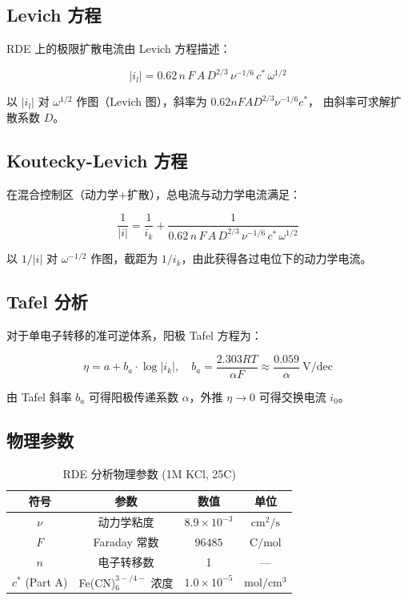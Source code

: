 \documentclass[12pt,a4paper]{ctexart}
\begin{document}
\subsection{Levich 方程}

RDE 上的极限扩散电流由 Levich 方程描述\cite{bard2001}：

\begin{equation}
|i_l| = 0.62\, n\, F\, A\, D^{2/3}\, \nu^{-1/6}\, c^*\, \omega^{1/2}
\label{eq:levich}
\end{equation}

以 $|i_l|$ 对 $\omega^{1/2}$ 作图（Levich 图），斜率为 $0.62 n F A D^{2/3} \nu^{-1/6} c^*$，
由斜率可求解扩散系数 $D$。

\subsection{Koutecky-Levich 方程}

在混合控制区（动力学+扩散），总电流与动力学电流满足：

\begin{equation}
\frac{1}{|i|} = \frac{1}{i_k} + \frac{1}{0.62\, n\, F\, A\, D^{2/3}\, \nu^{-1/6}\, c^*\, \omega^{1/2}}
\label{eq:kl}
\end{equation}

以 $1/|i|$ 对 $\omega^{-1/2}$ 作图，截距为 $1/i_k$，由此获得各过电位下的动力学电流。

\subsection{Tafel 分析}

对于单电子转移的准可逆体系，阳极 Tafel 方程为：

\begin{equation}
\eta = a + b_a \cdot \log|i_k|, \quad b_a = \frac{2.303 RT}{\alpha F} \approx \frac{0.059}{\alpha}\ \text{V/dec}
\label{eq:tafel}
\end{equation}

由 Tafel 斜率 $b_a$ 可得阳极传递系数 $\alpha$，外推 $\eta \rightarrow 0$ 可得交换电流 $i_0$。

\subsection{物理参数}

\begin{table}[h]
\centering
\caption{RDE 分析物理参数 (1M KCl, 25\textdegree C)}
\begin{tabular}{cccc}
\toprule
符号 & 参数 & 数值 & 单位 \\
\midrule
$\nu$ & 动力学粘度 & $8.9 \times 10^{-3}$ & $\text{cm}^2/\text{s}$ \\
$F$ & Faraday 常数 & $96485$ & $\text{C}/\text{mol}$ \\
$n$ & 电子转移数 & 1 & — \\
$c^*$ (Part A) & Fe(CN)$_6^{3-/4-}$ 浓度 & $1.0 \times 10^{-5}$ & $\text{mol}/\text{cm}^3$ \\
\bottomrule
\end{tabular}
\end{table}
\end{document}
